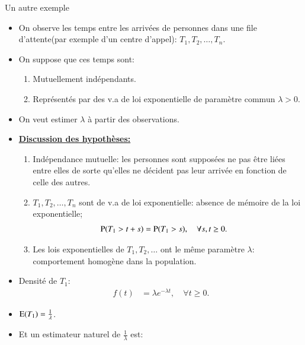         \begin{frame}
            [allowframebreaks]{Un autre exemple}
            \begin{itemize}
                \item On observe les temps entre les arrivées de personnes dans une file d'attente(par exemple d'un centre d'appel):
                $T_1, T_2, \ldots, T_n$.
                \item On suppose que ces temps sont: 
                \begin{enumerate}[-]
                    \item Mutuellement indépendants.
                    \item Représentés par des v.a de loi exponentielle de paramètre commun $\lambda>0$.
                \end{enumerate} 
                \item On veut estimer $\lambda$ à partir des observations.
                \framebreak
                \item \textbf{\underline{Discussion des hypothèses:}}    
                \begin{enumerate}[-]
                    \item Indépendance mutuelle: les personnes sont supposées ne pas être liées 
                    entre elles de sorte qu'elles ne décident pas leur arrivée en fonction de celle des autres.
                    \item $T_1, T_2, \ldots, T_n$ sont de v.a de loi exponentielle: absence de mémoire de la loi exponentielle;
                    \begin{align*}
                        \operatorname{P}(T_1 > t + s)&=\operatorname{P}(T_1>s), \quad \forall s, t \geq 0.
                    \end{align*}
                    \item Les lois exponentielles de $T_1, T_2, \ldots$ ont le même paramètre $\lambda$: 
                    comportement homogène dans la population.
                \end{enumerate}   
                \framebreak
                \item Densité de $T_1$: 
                \begin{align*}
                    f(t)&= \lambda e^{-\lambda t}, \quad \forall t \geq 0.
                \end{align*}
                \item $\operatorname{E}(T_1)=\frac{1}{\lambda}$.
                \item Et un estimateur naturel de $\frac{1}{\lambda}$ est: 

\end{itemize}
\end{frame}
